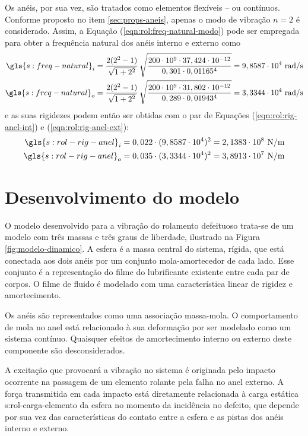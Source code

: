 \documentclass[12pt,oneside,english,brazil,lmodern,siglas,simbolos,cite=num]{ucsmonograph}
\begin{document}
	Os anéis, por sua vez, são tratados como elementos flexíveis -- ou contínuos.
	Conforme proposto no item \ref{sec:props-aneis}, apenas o modo de vibração $n=2$ é considerado.
	Assim, a Equação (\ref{eqn:rol:freq-natural-modo}) pode ser empregada para obter a frequência natural dos anéis interno e externo como
	\begin{align*}
		\gls{s:freq-natural}_i &= \frac{2(2^2 - 1)}{\sqrt{1+2^2}}\,
		\sqrt{\frac{200\cdot 10^9\cdot 37,424\cdot 10^{-12}}{0,301
		\cdot 0,01165^4}} = 9,8587\cdot 10^4\ \text{rad/s} \\
		\gls{s:freq-natural}_o &= \frac{2(2^2 - 1)}{\sqrt{1+2^2}}\,
		\sqrt{\frac{200\cdot 10^9\cdot 31,802\cdot 10^{-12}}{0,289
		\cdot 0,01943^4}} = 3,3344\cdot 10^4\ \text{rad/s} 
	\end{align*}
	e as suas rigidezes podem então ser obtidas com o par de Equações (\ref{eqn:rol:rig-anel-int}) e (\ref{eqn:rol:rig-anel-ext}):
	\begin{align*}
		\gls{s:rol-rig-anel}_i &= 0,022\cdot(9,8587\cdot 10^4)^2 =
		2,1383\cdot10^8\ \text{N/m} \\
		\gls{s:rol-rig-anel}_o &= 0,035\cdot(3,3344\cdot 10^4)^2 =
		3,8913\cdot10^7\ \text{N/m}
	\end{align*}
	
	\section{Desenvolvimento do modelo}
	O modelo desenvolvido para a vibração do rolamento defeituoso trata-se de um modelo com três massas e três graus de liberdade, ilustrado na Figura \ref{fig:modelo-dinamico}.
	A esfera é a massa central do sistema, rígida, que está conectada aos dois anéis por um conjunto mola-amortecedor de cada lado.
	Esse conjunto é a representação do filme do lubrificante existente entre cada par de corpos.
	O filme de fluido é modelado com uma característica linear de rigidez e amortecimento.
	
	Os anéis são representados como uma associação massa-mola.
	O comportamento de mola no anel está relacionado à sua deformação por ser modelado como um sistema contínuo.
	Quaisquer efeitos de amortecimento interno ou externo deste componente são desconsiderados.
	
	A excitação que provocará a vibração no sistema é originada pelo impacto ocorrente na passagem de um elemento rolante pela falha no anel externo.
	A força transmitida em cada impacto está diretamente relacionada à carga estática \gls{s:rol-carga-elemento} da esfera no momento da incidência no defeito, que depende por sua vez das características do contato entre a esfera e as pistas dos anéis interno e externo.
		
\end{document}
